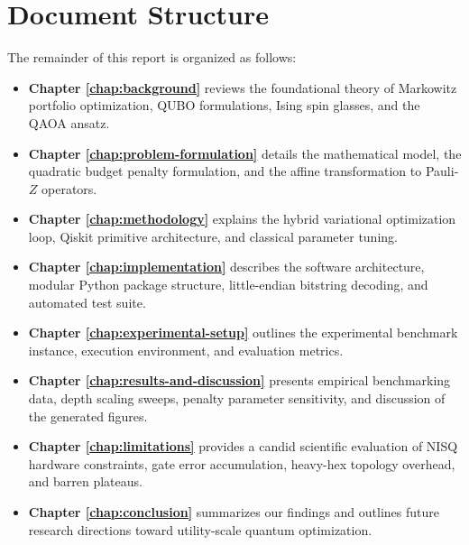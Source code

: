 \section{Document Structure}
The remainder of this report is organized as follows:
\begin{itemize}
    \item \textbf{Chapter \ref{chap:background}} reviews the foundational theory of Markowitz portfolio optimization, QUBO formulations, Ising spin glasses, and the QAOA ansatz.
    \item \textbf{Chapter \ref{chap:problem-formulation}} details the mathematical model, the quadratic budget penalty formulation, and the affine transformation to Pauli-$Z$ operators.
    \item \textbf{Chapter \ref{chap:methodology}} explains the hybrid variational optimization loop, Qiskit primitive architecture, and classical parameter tuning.
    \item \textbf{Chapter \ref{chap:implementation}} describes the software architecture, modular Python package structure, little-endian bitstring decoding, and automated test suite.
    \item \textbf{Chapter \ref{chap:experimental-setup}} outlines the experimental benchmark instance, execution environment, and evaluation metrics.
    \item \textbf{Chapter \ref{chap:results-and-discussion}} presents empirical benchmarking data, depth scaling sweeps, penalty parameter sensitivity, and discussion of the generated figures.
    \item \textbf{Chapter \ref{chap:limitations}} provides a candid scientific evaluation of NISQ hardware constraints, gate error accumulation, heavy-hex topology overhead, and barren plateaus.
    \item \textbf{Chapter \ref{chap:conclusion}} summarizes our findings and outlines future research directions toward utility-scale quantum optimization.
\end{itemize}
